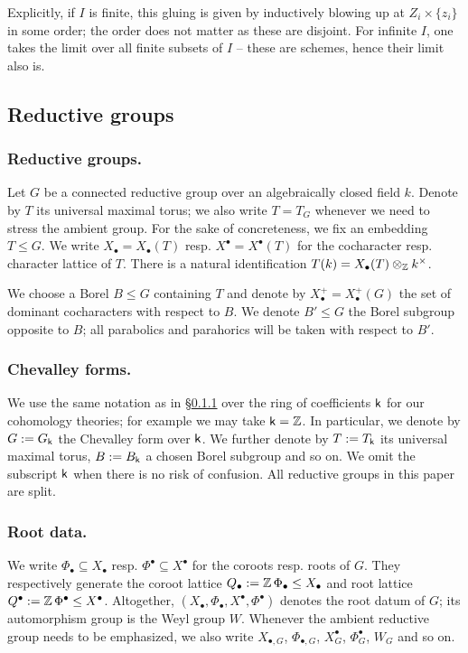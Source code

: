 Explicitly, if $I$ is finite, this gluing is given by inductively blowing up at $Z_i \times \{ z_i \}$ in some order; the order does not matter as these are disjoint. For infinite $I$, one takes the limit over all finite subsets of $I$ -- these are schemes, hence their limit also is.


\subsection{Reductive groups}
\subsubsection{Reductive groups.}\label{subsubsection: reductive groups}
Let $G$ be a connected reductive group over an algebraically closed field $k$. 
Denote by $T$ its universal maximal torus; we also write $T = T_G$ whenever we need to stress the ambient group. For the sake of concreteness, we fix an embedding $T \leq G$. We write $X_{\bullet} = X_{\bullet}(T)$ resp. $X^{\bullet}=X^{\bullet}(T)$ for the cocharacter resp. character lattice of $T$. There is a natural identification $T(k) = X_{\bullet}(T) \otimes _{\operatorname{\mathbb{Z}}} k^{\times}$.

We choose a Borel $B \leq G$ containing $T$ and denote by $X^{+}_{\bullet} = X^{+}_{\bullet}(G)$ the set of dominant cocharacters with respect to $B$.
%
We denote $B' \leq G$ the Borel subgroup opposite to $B$; all parabolics and parahorics will be taken with respect to $B'$.

\subsubsection{Chevalley forms.}
We use the same notation as in \S \ref{subsubsection: reductive groups} over the ring of coefficients $\mathsf{k}$ for our cohomology theories; for example we may take $\mathsf{k} = \operatorname{\mathbb{Z}}$. In particular, we denote by $G := G_{\mathsf{k}}$ the Chevalley form over $\mathsf{k}$. We further denote by $T := T_{\mathsf{k}}$ its universal maximal torus, $B := B_{\mathsf{k}}$ a chosen Borel subgroup and so on. We omit the subscript $\mathsf{k}$ when there is no risk of confusion. All reductive groups in this paper are split.


\subsubsection{Root data.}
We write $\Phi_{\bullet} \subseteq X_{\bullet}$ resp. $\Phi^{\bullet} \subseteq X^{\bullet}$ for the coroots resp. roots of $G$. They respectively generate the coroot lattice $Q_{\bullet} := \operatorname{\mathbb{Z}}\Phi_{\bullet} \leq X_{\bullet}$ and root lattice $Q^{\bullet} :=\operatorname{\mathbb{Z}}\Phi^{\bullet} \leq X^{\bullet}$.
Altogether, $(X_{\bullet}, \Phi_{\bullet}, X^{\bullet}, \Phi^{\bullet})$ denotes the root datum of $G$; its automorphism group is the Weyl group $W$.
%
Whenever the ambient reductive group needs to be emphasized, we also write $X_{\bullet, G}$, $\Phi_{\bullet, G} $, $X^{\bullet}_G$, $\Phi^{\bullet}_G$, $W_G$ and so on.

